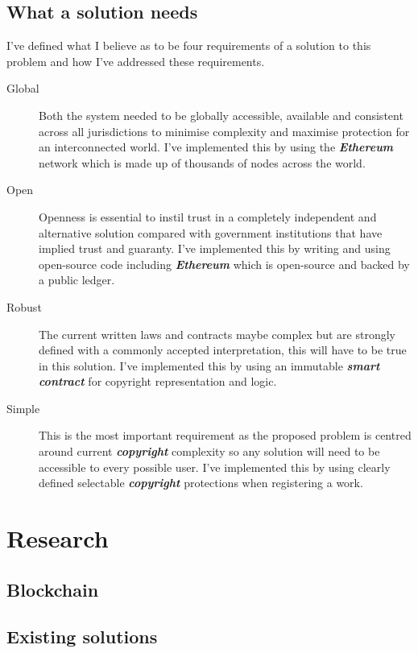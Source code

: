 \documentclass[12pt]{article}
\newcommand{\keyword}[1]{\textbf{\textit{#1}}}
\begin{document}
\subsection{What a solution needs}

I've defined what I believe as to be four requirements of a solution to this problem and how I've addressed these requirements.

\begin{description}
	\item[Global] Both the system needed to be globally accessible, available and consistent across all jurisdictions to minimise complexity and maximise protection for an interconnected world. I've implemented this by using the \keyword{Ethereum} network which is made up of thousands of nodes across the world.
	\item[Open] Openness is essential to instil trust in a completely independent and alternative solution compared with government institutions that have implied trust and guaranty. I've implemented this by writing and using open-source code including \keyword{Ethereum} which is open-source and backed by a public ledger.
	\item[Robust] The current written laws and contracts maybe complex but are strongly defined with a commonly accepted interpretation, this will have to be true in this solution. I've implemented this by using an immutable \keyword{smart contract} for copyright representation and logic.
	\item[Simple] This is the most important requirement as the proposed problem is centred around current \keyword{copyright} complexity so any solution will need to be accessible to every possible user. I've implemented this by using clearly defined selectable \keyword{copyright} protections when registering a work.
\end{description}

\section{Research}
\subsection{Blockchain}

\subsection{Existing solutions}
\end{document}
